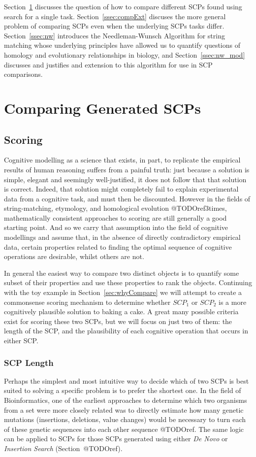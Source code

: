 \documentclass[
11pt, %
english, %
singlespacing, %
headsepline, %
]{MastersDoctoralThesis} %
\begin{document}
Section~\ref{ssec:compGen} discusses the question of how to compare different SCPs found using search for a single task. Section~\ref{ssec:compExt} discuses the more general problem of comparing SCPs even when the underlying SCPs tasks differ. Section~\ref{ssec:nw} introduces the Needleman-Wunsch Algorithm for string matching whose underlying principles have allowed us to quantify questions of homology and evolutionary relationships in biology, and Section~\ref{ssec:nw_mod} discusses and justifies and extension to this algorithm for use in SCP comparisons.

\section{Comparing Generated SCPs} \label{ssec:compGen}
\subsection{Scoring}
Cognitive modelling as a science that exists, in part, to replicate the empirical results of human reasoning suffers from a painful truth: just because a solution is simple, elegant and seemingly well-justified, it does not follow that that solution is correct. Indeed, that solution might completely fail to explain experimental data from a cognitive task, and must then be discounted. However in the fields of string-matching, etymology, and homological evolution @TODOref3times, mathematically consistent approaches to scoring are still generally a good starting point. And so we carry that assumption into the field of cognitive modellings and assume that, in the absence of directly contradictory empirical data, certain properties related to finding the optimal sequence of cognitive operations are desirable, whilst others are not.

In general the easiest way to compare two distinct objects is to quantify some subset of their properties and use these properties to rank the objects. Continuing with the toy example in Section~\ref{sec:whyCompare} we will attempt to create a commonsense scoring mechanism to determine whether $SCP_1$ or $SCP_2$ is a more cognitively plausible solution to baking a cake. A great many possible criteria exist for scoring these two SCPs, but we will focus on just two of them: the length of the SCP, and the plausibility of each cognitive operation that occurs in either SCP.

\subsubsection{SCP Length}
Perhaps the simplest and most intuitive way to decide which of two SCPs is best suited to solving a specific problem is to prefer the shortest one. In the field of Bioinformatics, one of the earliest approaches to determine which two organisms from a set were more closely related was to directly estimate how many genetic mutations (insertions, deletions, value changes) would be necessary to turn each of these genetic sequences into each other sequence @TODOref. The same logic can be applied to SCPs for those SCPs generated using either \textit{De Novo} or \textit{Insertion Search} (Section~@TODOref).
\end{document}
